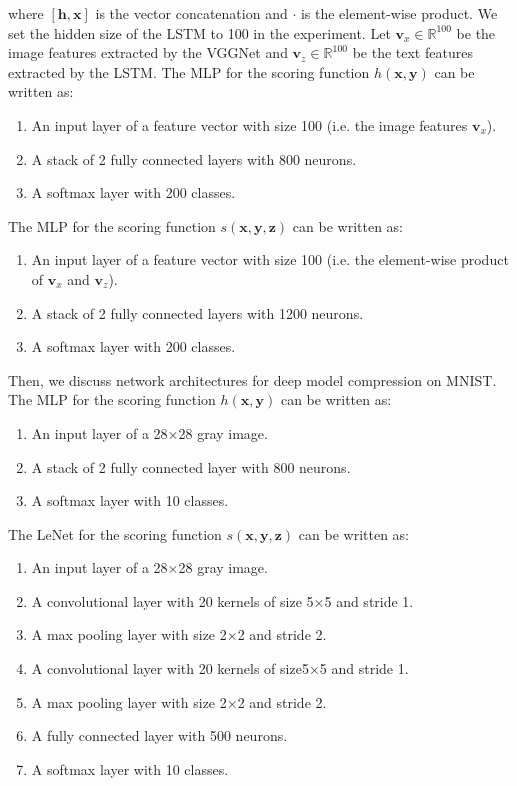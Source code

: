 \documentclass{article}
\newcommand{\OVEC}[1]{\bm{#1}} %
\begin{document}
where $[\OVEC{h},\OVEC{x}]$ is the vector concatenation and $\cdot$ is the element-wise product.
We set the hidden size of the LSTM to 100 in the experiment.
Let $\OVEC{v}_{x} \in \mathbb{R}^{100}$ be the image features extracted by the VGGNet and $\OVEC{v}_{z} \in \mathbb{R}^{100}$ be the text features extracted by the LSTM.
The MLP for the scoring function $h(\OVEC{x},\OVEC{y})$ can be written as:
\begin{enumerate}
\item An input layer of a feature vector with size 100 (i.e. the image features $\OVEC{v}_{x}$).
\item A stack of 2 fully connected layers with 800 neurons.
\item A softmax layer with 200 classes.
\end{enumerate}
The MLP for the scoring function $s(\OVEC{x},\OVEC{y},\OVEC{z})$ can be written as:
\begin{enumerate}
\item An input layer of a feature vector with size 100 (i.e. the element-wise product of $\OVEC{v}_{x}$ and $\OVEC{v}_{z}$).
\item A stack of 2 fully connected layers with 1200 neurons.
\item A softmax layer with 200 classes.
\end{enumerate}

Then, we discuss network architectures for deep model compression on MNIST.
The MLP for the scoring function $h(\OVEC{x},\OVEC{y})$ can be written as:
\begin{enumerate}
\item An input layer of a 28$\times$28 gray image.
\item A stack of 2 fully connected layer with 800 neurons.
\item A softmax layer with 10 classes.
\end{enumerate}
The LeNet for the scoring function $s(\OVEC{x},\OVEC{y},\OVEC{z})$ can be written as:
\begin{enumerate}
\item An input layer of a 28$\times$28 gray image.
\item A convolutional layer with 20 kernels of size 5$\times$5 and stride 1.
\item A max pooling layer with size 2$\times$2 and stride 2.
\item A convolutional layer with 20 kernels of size5$\times$5 and stride 1.
\item A max pooling layer with size 2$\times$2 and stride 2.
\item A fully connected layer with 500 neurons.
\item A softmax layer with 10 classes.
\end{enumerate}
\end{document}
